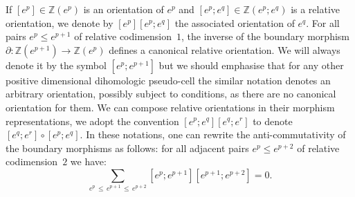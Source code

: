 \documentclass[AHL,Unicode,longabstracts,published]{cedram}
\newcommand{\Z}{\mathbb{Z}}
\begin{document}
If $[e^p]\in\Z(e^p)$ is an orientation of $e^p$ and $[e^p;e^q]\in\Z(e^p;e^q)$ is a relative orientation, we denote by $[e^p][e^p;e^q]$ the associated orientation of $e^q$. For all pairs $e^p\leq e^{p+1}$ of relative codimension~$1$, the inverse of the boundary morphism $\partial : \Z(e^{p+1})\rightarrow\Z(e^{p})$ defines a canonical relative orientation. We will always denote it by the symbol $[e^p;e^{p+1}]$ but we should emphasise that for any other positive dimensional dihomologic pseudo-cell the similar notation denotes an arbitrary orientation, possibly subject to conditions, as there are no canonical orientation for them. We can compose relative orientations in their morphism representations, we adopt the convention $[e^p;e^q][e^q;e^r]$ to denote $[e^q;e^r]\circ[e^p;e^q]$. In these notations, one can rewrite the anti-commutativity of the boundary morphisms as follows: for all adjacent pairs $e^p\leq e^{p+2}$ of relative codimension~$2$ we have:
\begin{equation*}
\sum_{e^p\,\leq\,e^{p+1}\,\leq\,e^{p+2}}\left[e^p;e^{p+1}\right]\left[e^{p+1};e^{p+2}\right]=0.
\end{equation*}
\end{document}

